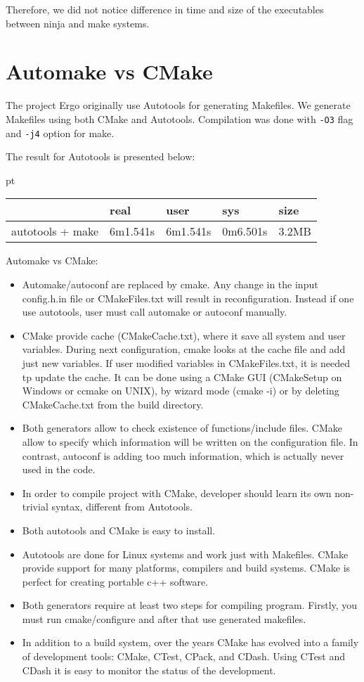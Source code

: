 \documentclass[a4paper,10pt]{article}
\begin{document}
Therefore, we did not notice difference in time and size of the executables between ninja and make systems.



\section{Automake vs CMake}

The project Ergo originally use Autotools for generating Makefiles. We generate Makefiles using both CMake and Autotools. Compilation was done with \texttt{-O3} flag and \texttt{-j4} option for make.

The result for Autotools is presented below:

 pt

\begin{tabular}{|l|l|l|l|l|}
	\hline
	& real & user & sys & size\\
	\hline
	autotools + make & 6m1.541s & 6m1.541s & 0m6.501s & 3.2MB\\
	\hline
\end{tabular}

\newpage


Automake vs CMake:

\begin{itemize}
 \item Automake/autoconf are replaced by cmake. Any change in the input config.h.in file or CMakeFiles.txt will result in reconfiguration. Instead if one use autotools, user must call automake or autoconf manually.
 \item CMake provide cache (CMakeCache.txt), where it save all system and user variables. During next configuration, cmake looks at the cache file and add just new variables.  If user modified variables in CMakeFiles.txt, it is needed tp update the cache. It can be done using a CMake GUI (CMakeSetup on Windows or ccmake on UNIX), by wizard mode (cmake -i) or by deleting CMakeCache.txt from the build directory.
  \item  Both generators allow to check existence of functions/include files. CMake allow to specify which information will be written on the configuration file. In contrast, autoconf is adding too much information, which is actually never used in the code.
 \item  In order to compile project with CMake, developer should learn its own non-trivial syntax, different from Autotools.
 \item  Both autotools and CMake is easy to install.
 \item  Autotools are done for Linux systems and work just with Makefiles. CMake provide support for many platforms, compilers and build systems. CMake is perfect for creating portable c++ software.
 \item  Both generators require at least two steps for compiling program. Firstly, you must run cmake/configure and after that use generated makefiles. 
 \item  In addition to a build system, over the years CMake has evolved into a family of development tools: CMake, CTest, CPack, and CDash. Using CTest and CDash it is easy to monitor the status of the development.
\end{itemize}
\end{document}
